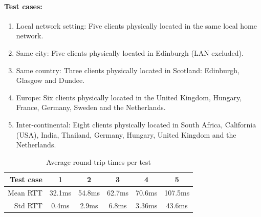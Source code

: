 \documentclass[bsc, 12pt, twoside, singlespacing, parskip, abbrevs, notimes, normalheadings, logo]{styles/infthesis}
\begin{document}
\paragraph*{Test cases:}
\begin{enumerate}
\item Local network setting: Five clients physically located in the same local home network.

\item Same city: Five clients physically located in Edinburgh (LAN excluded).

\item Same country: Three clients physically located in Scotland: Edinburgh, Glasgow and Dundee.

\item Europe: Six clients physically located in the United Kingdom, Hungary, France, Germany, Sweden and the Netherlands.

\item Inter-continental: Eight clients physically located in South Africa, California (USA), India, Thailand, Germany, Hungary, United Kingdom and the Netherlands.
\end{enumerate}

\begin{table}[H]
\centering
  \begin{tabular}{ | r || c | c | c | c | c |}
    \hline
    Test case 		& 1 		& 2 		& 3 		& 4 		& 5 		\\ \hline\hline
    Mean RTT 		& 32.1ms 	& 54.8ms 	& 62.7ms 	& 70.6ms 	& 107.5ms	\\ \hline
    Std RTT			& 0.4ms		& 2.9ms		& 6.8ms		& 3.36ms	& 43.6ms	\\ \hline
  \end{tabular}
  \caption{Average round-trip times per test}
  \label{table:geo_avg_roundtrip}
\end{table}
\end{document}
